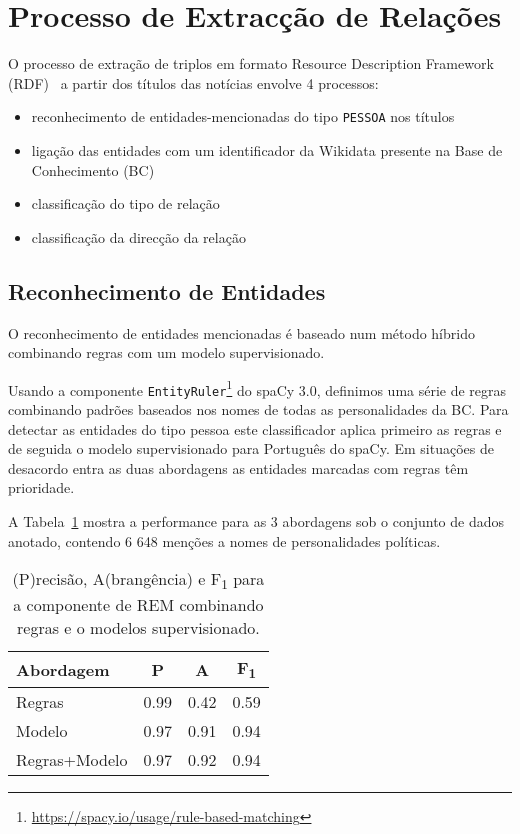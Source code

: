 \documentclass[a4paper, twocolumn, 11pt, twoside]{article}
\begin{document}
\section{Processo de Extracção de Relações}
\label{sec:classifiers}

O processo de extração de triplos em formato Resource Description Framework (RDF)~\citep{schreiber2014primer} a partir dos títulos das notícias envolve 4 processos: 

\begin{itemize}
\item reconhecimento de entidades-mencionadas do tipo \texttt{PESSOA} nos títulos
\item ligação das entidades com um identificador da Wikidata presente na Base de Conhecimento (BC)
\item classificação do tipo de relação
\item classificação da direcção da relação
\end{itemize}

\subsection{Reconhecimento de Entidades}
\label{subsec:ner}


O reconhecimento de entidades mencionadas é baseado num método híbrido combinando regras com um modelo supervisionado. 

Usando a componente \texttt{EntityRuler}\footnote{\url{https://spacy.io/usage/rule-based-matching}} do spaCy 3.0, definimos uma série de regras combinando padrões baseados nos nomes de todas as personalidades da BC. Para detectar as entidades do tipo pessoa este classificador aplica primeiro as regras e de seguida o modelo supervisionado para Português do spaCy. Em situações de desacordo entra as duas abordagens as entidades marcadas com regras têm prioridade.

A Tabela~\ref{tab:results_ner} mostra a performance para as 3 abordagens sob o conjunto de dados anotado, contendo 6 648 menções a nomes de personalidades políticas.


\begin{table}
    \begin{center}
    \begin{tabular}{l ccc}
		{\bf Abordagem}  & {\bf P} & {\bf A} & {\bf F\textsubscript{1}} \\
        \hline
        Regras           &  0.99     &  0.42     & 		0.59		\\
        Modelo           &  0.97     &  0.91     & 		0.94		\\
		Regras+Modelo    &  0.97     &  0.92     & 		0.94		\\
    \end{tabular}
	\caption{ (P)recisão, A(brangência) e F\textsubscript{1} para a componente de REM combinando regras e o modelos supervisionado.}	
	\label{tab:results_ner}
	\end{center}
\end{table}
\end{document}

